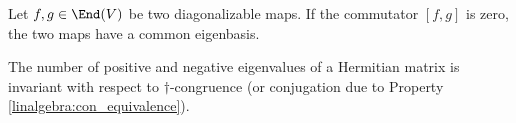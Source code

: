     \begin{property}[Commutator]
        Let $f,g\in\End(V)$ be two diagonalizable maps. If the commutator $[f,g]$ is zero, the two maps have a common eigenbasis.
    \end{property}

    \begin{theorem}
        The number of positive and negative eigenvalues of a Hermitian matrix is invariant with respect to $\dag$-congruence (or conjugation due to Property \ref{linalgebra:con_equivalence}).
    \end{theorem}